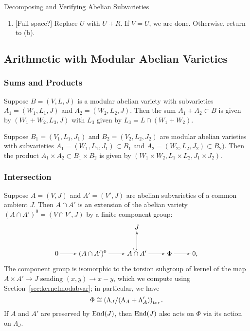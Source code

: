 \documentclass{article}
\begin{document}
\begin{algorithm}{Decomposing and Verifying Abelian Subvarieties}
\begin{enumerate}
\begin{enumerate}
			            Choose any $v\in V\setminus U$. By
			            Proposition~\ref{prop:integral_degen}, if $W$ is an abelian
			            subvariety then there exists $q_1,\ldots,q_r$
			            such that $v\in \Im \left(\sum_{i=1} ^r q_i
				            \delta_i\right)$. If this is not the case, return
			            'NO'. Let $R = \Im \left(\sum_{i=1} ^r q_i
				            \delta_i\right)$. If $R\not\subset V$, return 'NO'.
			      \item{} [Full space?]
			            Replace $U$ with $U+R$. If $V=U$, we are done. Otherwise,
			            return to (b).
		      \end{enumerate}
	\end{enumerate}
\end{algorithm}


\subsection{Arithmetic with Modular Abelian Varieties}

\subsubsection{Sums and Products}

Suppose $B=(V, L, J)$ is a modular abelian variety with subvarieties $A_1=(W_1,
	L_1, J)$ and $A_2=(W_2, L_2, J)$. Then the sum $A_1+A_2\subset B$ is given by
$(W_1+W_2, L_3, J)$ with $L_3$ given by $L_3 = L\cap (W_1+W_2)$.

Suppose $B_1=(V_1, L_1, J_1)$ and $B_2=(V_2, L_2, J_2)$ are modular abelian
varieties with subvarieties $A_1=(W_1, L_1, J_1)\subset B_1$ and $A_2=(W_2,
	L_2, J_2)\subset B_2)$. Then the product $A_1\times A_2\subset B_1\times
	B_2$ is given by $(W_1\times W_2, L_1\times L_2, J_1\times J_2)$.

\subsubsection{Intersection}


Suppose $A = (V,J)$ and $A' = (V', J)$ are abelian subvarieties of a
common ambient $J$.  Then $A\cap A'$ is an extension of the abelian
variety $(A\cap A')^0 = (V\cap V', J)$ by a finite component group:
$$
	\xymatrix{
		& & J & & \\
		0\ar[r]& (A\cap A')^0 \ar[r]&  A\cap A'\ar@{^(->}[u] \ar[r]& \Phi\ar[r] & 0,
	}
$$
The component group is isomorphic to the torsion subgroup of kernel of
the map $A \times A' \to J$ sending $(x,y)\to x-y$, which we compute
using Section~\ref{sec:kernelmodabvar}; in particular, we have
$$
	\Phi \cong \left( \Lambda_J/(\Lambda_A + \Lambda_A')\right)_{\operatorname{tor}}.
$$
If $A$ and $A'$ are preserved by $\operatorname{End}(J)$, then $\operatorname{End}(J)$ also
acts on $\Phi$ via its action on $\Lambda_J$.
\end{document}
